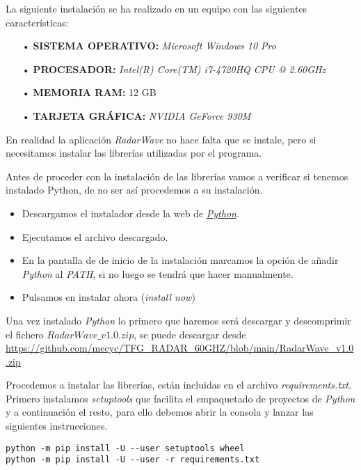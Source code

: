 La siguiente instalación se ha realizado en un equipo con las siguientes características:
\begin{itemize}
\item[•] \textbf{SISTEMA OPERATIVO:} \textit{Microsoft Windows 10 Pro}
\item[•] \textbf{PROCESADOR:} \textit{Intel(R) Core(TM) i7-4720HQ CPU @ 2.60GHz}
\item[•] \textbf{MEMORIA RAM:} 12 GB
\item[•] \textbf{TARJETA GRÁFICA:} \textit{NVIDIA GeForce 930M}
\end{itemize}

En realidad la aplicación \textit{RadarWave} no hace falta que se instale, pero si necesitamos instalar las librerías utilizadas por el programa.

Antes de proceder con la instalación de las librerías vamos a verificar si tenemos instalado Python, de no ser así procedemos a su instalación.
\begin{itemize}
\item Descargamos el instalador desde la web de \href{https://www.python.org/downloads/}{\textit{Python}}.
\item Ejecutamos el archivo descargado.
\item En la pantalla de de inicio de la instalación marcamos la opción de añadir \textit{Python} al \textit{PATH}, si no luego se tendrá que hacer manualmente.
\item Pulsamos en instalar ahora (\textit{install now})


\end{itemize}

Una vez instalado \textit{Python} lo primero que haremos será descargar y descomprimir el fichero \textit{$RadarWave\_v1.0.zip$}, se puede descargar desde \url{https://github.com/mecyc/TFG_RADAR_60GHZ/blob/main/RadarWave_v1.0.zip} 

Procedemos a instalar las librerías, están incluidas en el archivo \textit{requirements.txt}. Primero instalamos \textit{setuptools} que facilita el empaquetado de proyectos de \textit{Python} y a continuación el resto, para ello debemos abrir la consola y lanzar las siguientes instrucciones.

\begin{verbatim}
python -m pip install -U --user setuptools wheel
python -m pip install -U --user -r requirements.txt
\end{verbatim}

